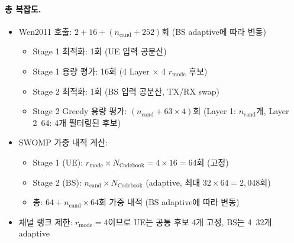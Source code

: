 \documentclass[10pt]{article}
\begin{document}
\paragraph{총 복잡도.}
\begin{itemize}
    \item Wen2011 호출: $2 + 16 + (n_{\text{cand}} + 252)$회 (BS adaptive에 따라 변동)
    \begin{itemize}
        \item Stage 1 최적화: 1회 (UE 입력 공분산)
        \item Stage 1 용량 평가: 16회 (4 Layer $\times$ 4 $r_{\text{mode}}$ 후보)
        \item Stage 2 최적화: 1회 (BS 입력 공분산, TX/RX swap)
        \item Stage 2 Greedy 용량 평가: $(n_{\text{cand}} + 63 \times 4)$회 (Layer 1: $n_{\text{cand}}$개, Layer 2~64: 4개 필터링된 후보)
    \end{itemize}
    \item SWOMP 가중 내적 계산:
    \begin{itemize}
        \item Stage 1 (UE): $r_{\text{mode}} \times N_{\text{Codebook}} = 4 \times 16 = 64$회 (고정)
        \item Stage 2 (BS): $n_{\text{cand}} \times N_{\text{Codebook}}$ (adaptive, 최대 $32 \times 64 = 2{,}048$회)
        \item 총: $64 + n_{\text{cand}} \times 64$회 가중 내적 (BS adaptive에 따라 변동)
    \end{itemize}
    \item 채널 랭크 제한: $r_{\text{mode}} = 4$이므로 UE는 공통 후보 4개 고정, BS는 4~32개 adaptive
\end{itemize}
\end{document}
